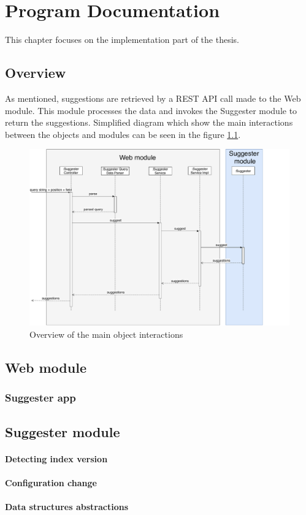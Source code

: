 \chapter{Program Documentation}
\label{chap:program}

This chapter focuses on the implementation part of the thesis.

\section{Overview}
As mentioned, suggestions are retrieved by a REST API call made to the Web module. This module processes the data and
invokes the Suggester module to return the suggestions. Simplified diagram which show the main interactions between the
objects and modules can be seen in the figure \ref{programmer_sequence}.
\begin{figure}[htbp]
    \centering
    \includegraphics[width=145mm]{../img/programmer_sequence.pdf}
    \caption{Overview of the main object interactions}
    \label{programmer_sequence}
\end{figure}

\section{Web module}

\subsection{Suggester app}

\section{Suggester module}

\subsubsection{Detecting index version}

\subsubsection{Configuration change}

\subsubsection{Data structures abstractions}
